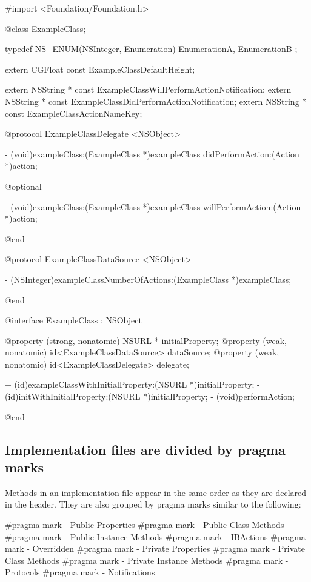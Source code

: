 \documentclass[10pt]{extarticle}
\newenvironment{codelisting}
{\footnotesize\mdframed[middlelinewidth=0.5pt, middlelinecolor=BaliHaiColor, skipabove=15pt]\verbatim}
{\endverbatim\endmdframed\vspace{12pt}\normalsize}
\begin{document}
\begin{codelisting}
#import <Foundation/Foundation.h>

@class ExampleClass;


typedef NS_ENUM(NSInteger, Enumeration) {
    EnumerationA,
    EnumerationB
};

extern CGFloat const ExampleClassDefaultHeight;

extern NSString * const ExampleClassWillPerformActionNotification;
extern NSString * const ExampleClassDidPerformActionNotification;
extern NSString * const ExampleClassActionNameKey;


@protocol ExampleClassDelegate <NSObject>

- (void)exampleClass:(ExampleClass *)exampleClass didPerformAction:(Action *)action;

@optional

- (void)exampleClass:(ExampleClass *)exampleClass willPerformAction:(Action *)action;

@end


@protocol ExampleClassDataSource <NSObject>

- (NSInteger)exampleClassNumberOfActions:(ExampleClass *)exampleClass;

@end


@interface ExampleClass : NSObject

@property (strong, nonatomic) NSURL * initialProperty;
@property (weak, nonatomic) id<ExampleClassDataSource> dataSource;
@property (weak, nonatomic) id<ExampleClassDelegate> delegate;

+ (id)exampleClassWithInitialProperty:(NSURL *)initialProperty;
- (id)initWithInitialProperty:(NSURL *)initialProperty;
- (void)performAction;

@end
\end{codelisting}


\subsection{Implementation files are divided by pragma marks}

Methods in an implementation file appear in the same order as they are declared in the header. They are also grouped by pragma marks similar to the following:

\begin{codelisting}
#pragma mark - Public Properties
#pragma mark - Public Class Methods
#pragma mark - Public Instance Methods
#pragma mark - IBActions
#pragma mark - Overridden
#pragma mark - Private Properties
#pragma mark - Private Class Methods
#pragma mark - Private Instance Methods
#pragma mark - Protocols
#pragma mark - Notifications
\end{codelisting}
\end{document}

